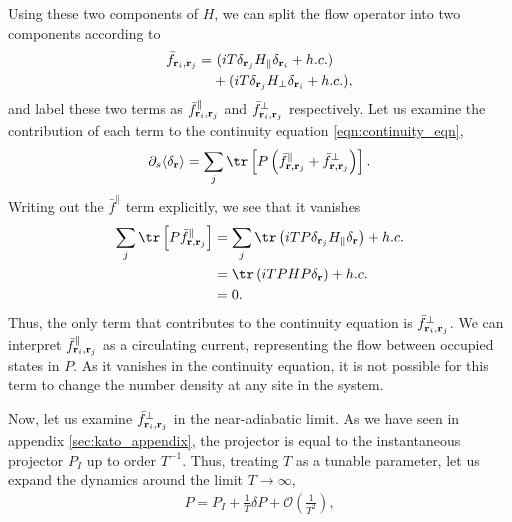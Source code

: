 Using these two components of $H$, we can split the flow operator into two components according to
\begin{align}
\begin{aligned}
    \bar f_{\textbf r_i, \textbf r_j} = 
    &\ (iT \delta_{\textbf r_j}H_\parallel \delta_{\textbf r_i } + h.c.)\\ 
    &+ 
    (iT \delta_{\textbf r_j}H_\perp \delta_{\textbf r_i } + h.c.),
\end{aligned}
\end{align}
and label these two terms as $\bar f^\parallel _{\textbf r_i, \textbf r_j}$ and $\bar f^\perp_{\textbf r_i, \textbf r_j}$ respectively. Let us examine the contribution of each term to the continuity equation \ref{eqn:continuity_eqn},
\begin{align}
    \partial_s \langle \delta_{\textbf r}\rangle = \sum_j \tr \left [ 
    P \left (\bar f^{\parallel}_{\textbf r, \textbf r_j} + 
     \bar f^{\perp}_{\textbf r, \textbf r_j}\right )
    \right ].
\end{align}
Writing out the $\bar f^\parallel$ term explicitly, we see that it vanishes
\begin{align}\label{eqn:f_vanishes}
    \begin{aligned}
    \sum_j \tr \left [ 
    P \bar f^{\parallel}_{\textbf r, \textbf r_j}
    \right ] &  = 
    \sum_j \tr \left ( iT P 
    \delta_{\textbf r_j} H_{\parallel}\delta_{\textbf r}
    \right ) + h.c. \\ 
    & = \tr \left ( 
      iT PHP \delta_{\textbf r}
    \right ) + h.c. \\ 
    &= 0.
    \end{aligned}
\end{align}
Thus, the only term that contributes to the continuity equation is $\bar f^\perp_{\textbf r_i, \textbf r_j}$. We can interpret $\bar f^\parallel_{\textbf r_i, \textbf r_j}$ as a circulating current, representing the flow between occupied states in $P$. As it vanishes in the continuity equation, it is not possible for this term to change the number density at any site in the system. \par
Now, let us examine $\bar f^\perp_{\textbf r_i, \textbf r_j}$ in the near-adiabatic limit. As we have seen in appendix \ref{sec:kato_appendix}, the projector is equal to the instantaneous projector $P_I$ up to order $T^{-1}$. Thus, treating $T$ as a tunable parameter, let us expand the dynamics around the limit $T \rightarrow \infty$, 
\begin{align}\label{eqn:p_expansion}
    P = P_I + \frac{1}{T}\delta P + \mathcal{O}\left (\frac{1}{T^2}\right ),
\end{align}
